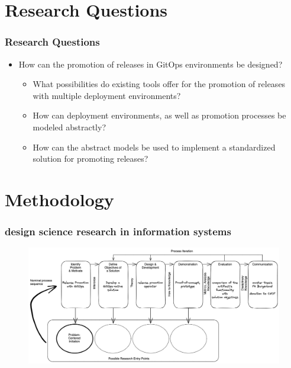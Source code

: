 \documentclass{beamer}
\begin{document}
\section{Research Questions}

\begin{frame}
\frametitle{Research Questions}

	\begin{itemize}
		\item How can the promotion of releases in GitOps environments be designed?
		\begin{itemize}
			\item What possibilities do existing tools offer for the promotion of releases with multiple deployment environments?
			\item How can deployment environments, as well as promotion processes be modeled abstractly?
			\item How can the abstract models be used to implement a standardized solution for promoting releases?
		\end{itemize}
	\end{itemize}

\end{frame}


\section{Methodology}

\begin{frame}
	\frametitle{design science research in information systems \\
		\autocite{designScienceResearchMethodologyForInformationSystemsResearch}}
	
	\begin{figure}[h]
		\centering
		\includegraphics[width=1.00\linewidth]{figures/dsrm-process-release-promotion-gitops.png}
	\end{figure}

\end{frame}
\end{document}
